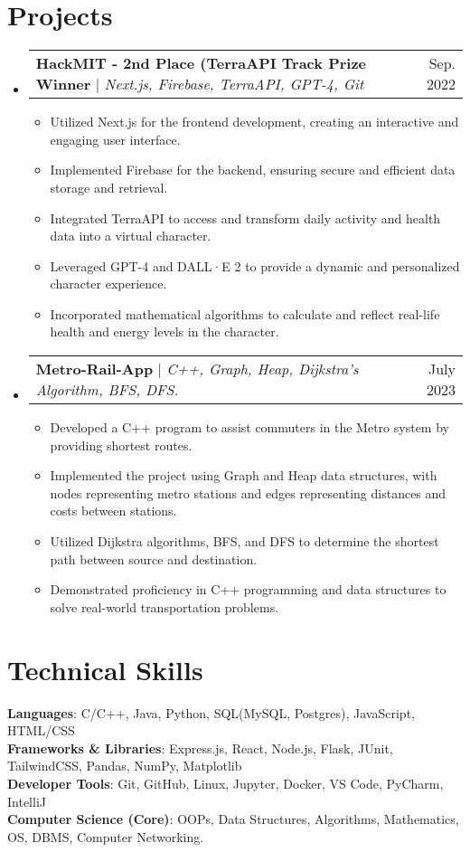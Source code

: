 \documentclass[letterpaper,11pt]{article}
\makeatletter
\newcommand{\resumeItem}[1]{
  \item\small{
    {#1 \vspace{-2pt}}
  }
}
\newcommand{\resumeProjectHeading}[2]{
    \item
    \begin{tabular*}{0.97\textwidth}{l@{\extracolsep{\fill}}r}
      \small#1 & #2 \\
    \end{tabular*}\vspace{-7pt}
}
\newcommand{\resumeSubHeadingListStart}{\begin{itemize}[leftmargin=0.15in, label={}]}
\newcommand{\resumeSubHeadingListEnd}{\end{itemize}}
\newcommand{\resumeItemListStart}{\begin{itemize}}
\newcommand{\resumeItemListEnd}{\end{itemize}\vspace{-5pt}}
\makeatother
\begin{document}
\section{Projects}
    \resumeSubHeadingListStart
      \resumeProjectHeading
          {\textbf{HackMIT - 2nd Place (TerraAPI Track Prize Winner} $|$ \emph{Next.js, Firebase, TerraAPI, GPT-4, Git}}{Sep. 2022}
          \resumeItemListStart
       \resumeItem {Utilized Next.js for the frontend development, creating an interactive and engaging user interface.}
    \resumeItem {Implemented Firebase for the backend, ensuring secure and efficient data storage and retrieval.}
    \resumeItem {Integrated TerraAPI to access and transform daily activity and health data into a virtual character.}
    \resumeItem {Leveraged GPT-4 and DALL·E 2 to provide a dynamic and personalized character experience.}
    \resumeItem {Incorporated mathematical algorithms to calculate and reflect real-life health and energy levels in the character.}
          \resumeItemListEnd
      \resumeProjectHeading
          {\textbf{Metro-Rail-App} $|$ \emph{C++, Graph, Heap, Dijkstra's Algorithm, BFS, DFS.}}{July 2023}
          \resumeItemListStart
           \resumeItem{Developed a C++ program to assist commuters in the Metro system by providing shortest routes.}
\resumeItem{Implemented the project using Graph and Heap data structures, with nodes representing metro stations and edges representing distances and costs between stations.}
\resumeItem{Utilized Dijkstra algorithms, BFS, and DFS to determine the shortest path between source and destination.}
\resumeItem{Demonstrated proficiency in C++ programming and data structures to solve real-world transportation problems.}

          \resumeItemListEnd
    \resumeSubHeadingListEnd



%
\section{Technical Skills}
 \begin{itemize}[leftmargin=0.15in, label={}]
    \small{\item{
     \textbf{Languages}{: C/C++, Java, Python, SQL(MySQL, Postgres), JavaScript, HTML/CSS} \\
     \textbf{Frameworks \& Libraries}{: Express.js, React, Node.js, Flask, JUnit, TailwindCSS, Pandas, NumPy, Matplotlib} \\
     \textbf{Developer Tools}{: Git, GitHub, Linux, Jupyter, Docker, VS Code, PyCharm, IntelliJ} \\
      \textbf{Computer Science (Core)}{: OOPs, Data Structures, Algorithms, Mathematics, OS, DBMS, Computer Networking.}
    }}
 \end{itemize}


\end{document}

